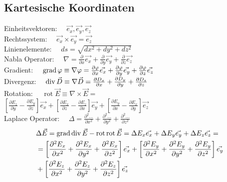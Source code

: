 \subsection{Kartesische Koordinaten}
Einheitsvektoren:   $\quad \vec{e_{x}}, \vec{e_{y}}, \vec{e_{z}}$\\
Rechtssystem:       $\quad \vec{e_{x}} \times \vec{e_{y}}=\vec{e_{z}}$\\
Linienelemente:     $\quad d s=\sqrt{d x^{2}+d y^{2}+d z^{2}}$\\
Nabla Operator:     $\quad \nabla=\frac{\partial}{\partial x} \vec{e_{x}}+\frac{\partial}{\partial y} \vec{e_{y}}+\frac{\partial}{\partial z} \vec{e_{z}}$\\
Gradient:           $\quad \operatorname{grad} \varphi \equiv \nabla \varphi=\frac{\partial \varphi}{\partial x} \vec{e_{x}}+\frac{\partial \varphi}{\partial y} \vec{e_{y}}+\frac{\partial \varphi}{\partial z} \vec{e_{z}}$\\
Divergenz:          $\quad \operatorname{div} \vec{D} \equiv \nabla \vec{D}=\frac{\partial D_{x}}{\partial x}+\frac{\partial D_{y}}{\partial y}+\frac{\partial D_{z}}{\partial z}$\\
Rotation:           $\quad \operatorname{rot} \vec{E} \equiv \nabla \times \vec{E} =$\\
$\left[\frac{\partial E_{z}}{\partial y}-\frac{\partial E_{y}}{\partial z}\right] \vec{e_{x}}+\left[\frac{\partial E_{x}}{\partial z}-\frac{\partial E_{z}}{\partial x}\right] \vec{e_{y}}+\left[\frac{\partial E_{y}}{\partial x}-\frac{\partial E_{x}}{\partial y}\right] \vec{e_{z}}$\\
Laplace Operator:   $\quad \Delta=\frac{\partial^{2} \ldots}{\partial x^{2}}+\frac{\partial^{2} \ldots}{\partial y^{2}}+\frac{\partial^{2} \ldots}{\partial z^{2}}$\\
\begin{align*}
     & \Delta \vec{E} = \operatorname{grad} \operatorname{div} \vec{E}-\operatorname{rot} \operatorname{rot} \vec{E} =\Delta E_{x} \vec{e_{x}}+\Delta E_{y} \vec{e_{y}}+\Delta E_{z} \vec{e_{z}}=                                                                                                                                              \\
     & = \left[\frac{\partial^{2} E_{x}}{\partial x^{2}}+\frac{\partial^{2} E_{x}}{\partial y^{2}}+\frac{\partial^{2} E_{x}}{\partial z^{2}}\right] \vec{e_{x}}+\left[\frac{\partial^{2} E_{y}}{\partial x^{2}}+\frac{\partial^{2} E_{y}}{\partial y^{2}}+\frac{\partial^{2} E_{y}}{\partial z^{2}}\right] \vec{e_{y}} \\
     & + \left[\frac{\partial^{2} E_{z}}{\partial x^{2}}+\frac{\partial^{2} E_{z}}{\partial y^{2}}+\frac{\partial^{2} E_{z}}{\partial z^{2}}\right] \vec{e_{z}}
\end{align*}


